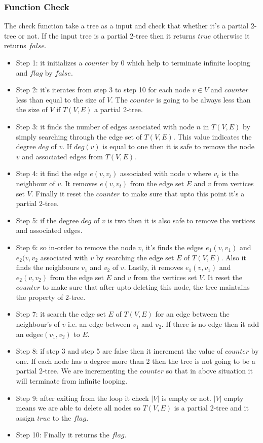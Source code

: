 \documentclass[12pt]{article}
\begin{document}
\subsubsection{Function Check}
The check function take a tree as a input and check that whether it's a partial 2-tree or not. If the input tree is a partial 2-tree then it returns $true$ otherwise it returns $false$.
\begin{itemize}[noitemsep]
\item Step 1: it initializes a $counter$ by 0 which help to terminate infinite looping and $flag$ by $false$.
\item Step 2: it's iterates from step 3 to step 10 for each node $v\in V$ and $counter$ less than equal to the size of $V$. The $counter$ is going to be always less than the size of $V$ if $T(V,E)$ a partial 2-tree. 
\item Step 3: it finds the number of edges associated with node $n$ in $T(V,E)$ by simply searching through the edge set of $T(V,E)$. This value indicates the degree $deg$ of $v$. If $deg(v)$ is equal to one then it is safe to remove the node $v$ and associated edges from $T(V,E)$.
\item Step 4: it find the edge $e(v,v_t)$ associated with node $v$ where $v_t$ is the neighbour of $v$. It removes  $e(v,v_t)$ from the edge set $E$ and $v$ from vertices set $V$. Finally it reset the $counter$ to make sure that upto this point it's a partial $2$-tree.
\item Step 5: if the degree $deg$ of $v$ is two then it is also safe to remove the vertices and associated edges.
\item Step 6: so in-order to remove the node $v$, it's finds the edges $e_1(v,v_1)$ and $e_2(v,v_2$ associated with $v$ by searching the edge set $E$ of $T(V,E)$. Also it finds the neighbours $v_1$ and $v_2$ of $v$. Lastly, it removes $e_1(v,v_1)$ and $e_2(v,v_2)$ from the edge set $E$ and $v$ from the vertices set $V$. It reset the $counter$ to make sure that after upto deleting this node, the tree maintains the property of 2-tree.
\item Step 7: it search the edge set $E$ of $T(V,E)$ for an edge between the neighbour's of $v$ i.e. an edge between $v_1$ and $v_2$. If there is no edge then it add an edge$e(v_1,v_2)$ to $E$.
 
\item Step 8: if step 3 and step 5 are false then it increment the value of $counter$ by one. If each node has a degree more than 2 then the tree is not going to be a partial 2-tree. We are incrementing the $counter$ so that in above situation it will terminate from infinite looping.
\item Step 9: after exiting from the loop it check $|V|$ is empty or not. $|V|$ empty means we are able to delete all nodes so $T(V,E)$ is a partial 2-tree and it assign $true$ to the $flag$.
\item Step 10: Finally it returns the $flag$.
\end{itemize}
\end{document}
